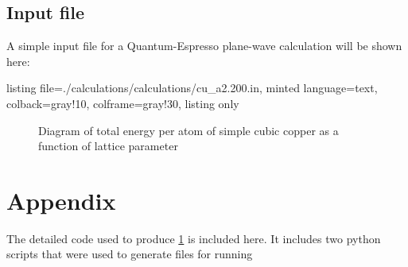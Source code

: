 \subsection{Input file}

A simple input file for a Quantum-Espresso plane-wave calculation will be shown
here:

\begin{center}
\begin{tcblisting}{listing file={./calculations/calculations/cu_a2.200.in},
                   minted language=text,
                   colback=gray!10,
                   colframe=gray!30,
                   listing only}
\end{tcblisting}
\end{center}

\begin{figure}[h]
    \centering
    
    \caption{Diagram of total energy per atom of simple cubic copper as 
    a function of lattice parameter}
    \label{fig:cu_cubic}
\end{figure}

\printbibliography

\section{Appendix}

The detailed code used to produce \cref{fig:cu_cubic} is included here. It includes
two python scripts that were used to generate files for running 


